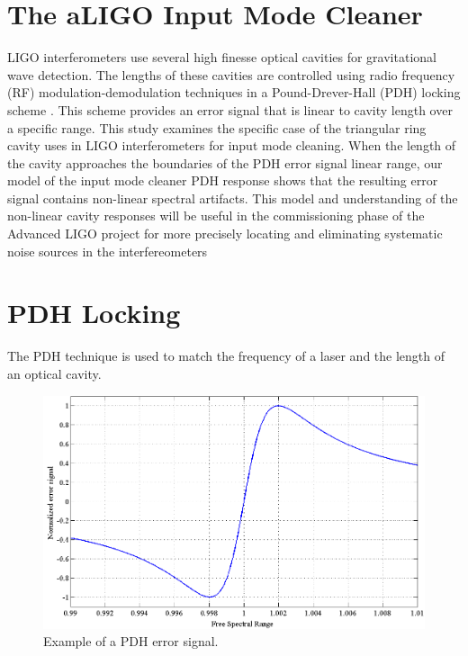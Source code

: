 \section{The aLIGO Input Mode Cleaner}

LIGO interferometers use several high finesse optical cavities for gravitational wave 
detection. The lengths of these cavities are controlled using radio frequency 
(RF) modulation-demodulation techniques in a Pound-Drever-Hall (PDH) locking scheme 
\cite{Black01}.  
This scheme provides an error signal that is linear to cavity length over a 
specific range. This study examines the specific case of the triangular ring cavity 
uses in LIGO interferometers for input mode cleaning. When the length of the cavity 
approaches the boundaries of the PDH error signal linear range, our model of the 
input mode cleaner PDH response shows that the resulting error signal contains 
non-linear spectral artifacts. This model and understanding of the non-linear 
cavity responses will be useful in the commissioning phase of the Advanced LIGO 
project for more precisely locating and eliminating systematic noise sources in 
the interfereometers

\section{PDH Locking}

The PDH technique is used to match the frequency of a laser and the length of an 
optical cavity. 

\begin{figure}[h!]
\centering
\includegraphics[width=\textwidth]{figures/IMCUpconversion/linear_pdh}
\caption[Example of a PDH error signal]{Example of a PDH error signal.}
\end{figure}

